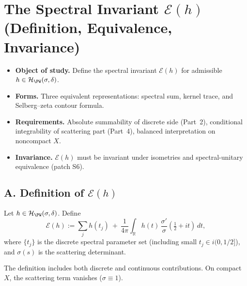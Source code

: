 \section{The Spectral Invariant $\mathcal E(h)$ (Definition, Equivalence, Invariance)}
\label{sec:spectral-invariant-part3}

\begin{tcolorbox}[colback=gray!5,colframe=gray!55,
  title=Scope \& Assumptions (Part 3/5 • Spectral Invariant • ZNB-9+++ Audit • ABSOLUTE FILL++)]
\begin{itemize}
  \item \textbf{Object of study.} Define the spectral invariant $\mathcal E(h)$ for admissible $h\in\mathcal H_{\PW}(\sigma,\delta)$.
  \item \textbf{Forms.} Three equivalent representations: spectral sum, kernel trace, and Selberg–zeta contour formula.
  \item \textbf{Requirements.} Absolute summability of discrete side (Part~2), conditional integrability of scattering part (Part~4), balanced interpretation on noncompact $X$.
  \item \textbf{Invariance.} $\mathcal E(h)$ must be invariant under isometries and spectral-unitary equivalence (patch S6).
\end{itemize}
\end{tcolorbox}

\subsection*{A. Definition of $\mathcal E(h)$}
\label{subsec:def-Eh-part3}

\begin{definition}
\label{def:Eh-part3}
Let $h\in\mathcal H_{\PW}(\sigma,\delta)$. Define
\[
  \mathcal E(h):=\sum_j h(t_j)\ +\ \frac{1}{4\pi}\int_{\mathbb R} h(t)\,\frac{\sigma'}{\sigma}\!\left(\tfrac12+it\right)\,dt,
\]
where $\{t_j\}$ is the discrete spectral parameter set (including small $t_j\in i(0,1/2]$), and $\sigma(s)$ is the scattering determinant.
\end{definition}

\begin{remark}
The definition includes both discrete and continuous contributions. On compact $X$, the scattering term vanishes ($\sigma\equiv 1$).
\end{remark}


